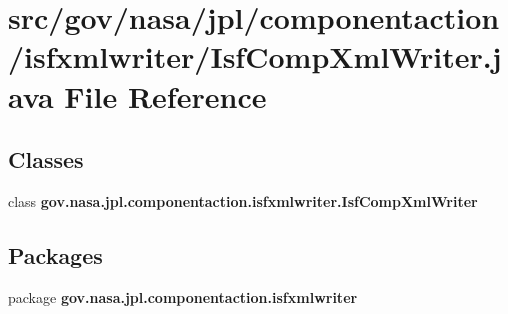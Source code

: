 \section{src/gov/nasa/jpl/componentaction/isfxmlwriter/\+Isf\+Comp\+Xml\+Writer.java File Reference}
\label{_isf_comp_xml_writer_8java}
\subsection*{Classes}
\begin{DoxyCompactItemize}
\item 
class {\bf gov.\+nasa.\+jpl.\+componentaction.\+isfxmlwriter.\+Isf\+Comp\+Xml\+Writer}
\end{DoxyCompactItemize}
\subsection*{Packages}
\begin{DoxyCompactItemize}
\item 
package {\bf gov.\+nasa.\+jpl.\+componentaction.\+isfxmlwriter}
\end{DoxyCompactItemize}
